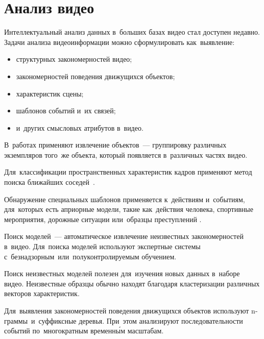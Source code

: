 
\section{Анализ видео}

Интеллектуальный анализ данных в~больших базах видео стал доступен недавно.
Задачи анализа видеоинформации можно сформулировать как~выявление:
\begin{itemize}
    \item структурных закономерностей видео;
    \item закономерностей поведения движущихся объектов;
    \item характеристик сцены;
    \item шаблонов событий и~их связей;
    \item и~других смысловых атрибутов в~видео.
\end{itemize}

В~работах применяют извлечение объектов~— группировку различных экземпляров
того~же объекта, который появляется в~различных частях видео.

Для~классификации пространственных характеристик кадров применяют
метод поиска ближайших соседей\
\cite{Anjulan:2009}.

Обнаружение специальных шаблонов применяется к~действиям и~событиям,
для~которых есть априорные модели, такие как~действия человека,
спортивные мероприятия, дорожные ситуации
или~образцы преступлений \cite{Quack:2006}.

Поиск моделей~— автоматическое извлечение неизвестных закономерностей в~видео.
Для~поиска моделей используют экспертные системы
с~безнадзорным\
или~полуконтролируемым обучением.

Поиск неизвестных моделей полезен
для~изучения новых данных в~наборе видео.
Неизвестные образцы обычно находят благодаря
кластеризации различных векторов характеристик.

Для~выявления закономерностей поведения движущихся объектов
используют n-граммы\ и~суффиксные
деревья\index{Суффиксное дерево}.
При~этом анализируют последовательности событий
по~многократным временны́м масштабам.












